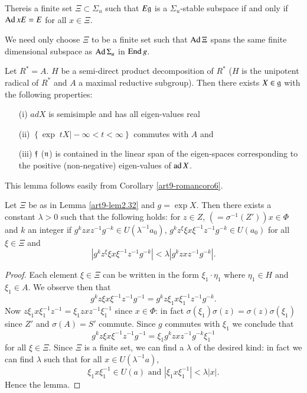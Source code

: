 \begin{lemma}\label{art9-lem2.32}
There\pageoriginale is a finite set $\Xi \subset \Sigma_u$ such that $E \mathfrak{g}$ is a $\Sigma_u$-stable subspace if and only if $\operatorname{Ad} x E= E$ for all $x \in \Xi$.
\end{lemma}

We need only choose $\Xi$ to be a finite set such that $\operatorname{Ad} \Xi$ spans the same finite dimensional subspace as $\operatorname{Ad} \Sigma_u$ in $\operatorname{End} g$.

\begin{lemma}\label{art9-lem2.33}
Let  $R^\ast = A$. $H$ be a semi-direct product decomposition of $R^\ast$ ($H$ is the unipotent radical of $R^\ast$ and $A$ a maximal reductive subgroup). Then there exists $X \in \mathfrak{g}$ with the following properties:
\begin{itemize}
\item[(i)] $ad X$ is semisimple and has all eigen-values real 

\item[(ii)] $\left\{\exp \; t X \big| - \infty < t < \infty  \right\}$ commutes with $A$ and

\item[(iii)] $\mathfrak{f}$ (\resp $\mathfrak{n}$) is contained in the linear span of the eigen-spaces corresponding to the positive (\resp non-negative) eigen-values of $\operatorname{ad} X$.
\end{itemize}
\end{lemma}

This lemma follows easily from Corollary \ref{art9-romancoro6}.

\begin{lemma}\label{art9-lem2.34}
Let $\Xi$ be as in Lemma \ref{art9-lem2.32} and $g = \exp X$. Then there exists a constant $\lambda > 0$ such that the following holds: for $z \in Z$, $(= \sigma^{-1} (Z')) x \in \Phi$ and $k$ an integer if $g^k z x z^{-1} g^{-k} \in U (\lambda^{-1} a_0)$, $g^k z^\xi \xi x \xi^{-1} z^{-1} g^{-k} \in U(a_0)$ for all $\xi \in \Xi$ and
$$
|g^k z^\xi \xi x \xi^{-1} z^{-1} g^{-k}| < \lambda | g^k z x z^{-1} g^{-k} |.
$$
\end{lemma}

\begin{proof}
Each element $\xi \in \Xi$ can be written in the form $\xi_1 \cdot \eta_1$ where $\eta_1 \in H$ and $\xi_1 \in A$. We observe then that 
$$
g^k z \xi x \xi^{-1} z^{-1} g^{-1} = g^k z \xi_1 x \xi^{-1}_1 z^{-1}g^{-k}.
$$
Now $z \xi_1 x \xi^{-1}_1 z^{-1} = \xi_1 z x z^{-1} \xi^{-1}_1$ since $x \in \Phi$: in fact $\sigma (\xi_1) \sigma (z) = \sigma (z) \sigma(\xi_1)$ since $Z'$ and $\sigma(A) = S'$ commute. Since $g$ commutes with $\xi_1$ we conclude that
$$
g^k z \xi x \xi^{-1} z^{-1} g^{-1} = \xi_1 g^k z x z^{-1} g^{-k} \xi^{-1}_1
$$
for all $\xi \in \Xi$. Since $\Xi$ is a finite set, we can find a $\lambda$ of the desired kind: in fact we can find $\lambda$ such that for all $x \in U (\lambda^{-1} a)$,
$$
\xi_1 x \xi^{-1}_1 \in U(a) \text{ and }  |\xi_1 x \xi^{-1}_1| < \lambda |x|.
$$
Hence the lemma.
\end{proof}

